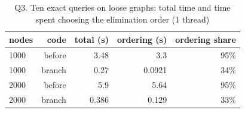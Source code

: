 \begin{table}[H]\centering\small
\caption{Q3. Ten exact queries on loose graphs: total time and time spent choosing the elimination order (1 thread)}\label{tab:q3}

\begin{tabular}{lrrrr}\toprule
nodes & code & total (s) & ordering (s) & ordering share \\ \midrule
1000 & before & 3.48 & 3.3 & 95\% \\
1000 & branch & 0.27 & 0.0921 & 34\% \\
2000 & before & 5.9 & 5.64 & 95\% \\
2000 & branch & 0.386 & 0.129 & 33\% \\
\bottomrule\end{tabular}
\end{table}
